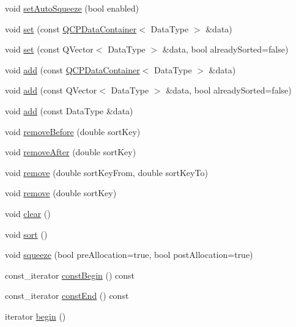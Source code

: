 \begin{DoxyCompactItemize}
\item 
void \hyperlink{classQCPDataContainer_a233f866760a78950d2a393c1a4bc54b5}{set\+Auto\+Squeeze} (bool enabled)
\item 
void \hyperlink{classQCPDataContainer_ae7042bd534fc3ce7befa2ce3f790b5bf}{set} (const \hyperlink{classQCPDataContainer}{Q\+C\+P\+Data\+Container}$<$ Data\+Type $>$ \&data)
\item 
void \hyperlink{classQCPDataContainer_aff99fffbb26597a354c4bc8312596ab2}{set} (const Q\+Vector$<$ Data\+Type $>$ \&data, bool already\+Sorted=false)
\item 
void \hyperlink{classQCPDataContainer_a42b98bd994307ccd163a43d576f91ad9}{add} (const \hyperlink{classQCPDataContainer}{Q\+C\+P\+Data\+Container}$<$ Data\+Type $>$ \&data)
\item 
void \hyperlink{classQCPDataContainer_a51d2a4c9ce4baf5e950b767d26673972}{add} (const Q\+Vector$<$ Data\+Type $>$ \&data, bool already\+Sorted=false)
\item 
void \hyperlink{classQCPDataContainer_a715e8e9972466804954a2f8fbd5288b7}{add} (const Data\+Type \&data)
\item 
void \hyperlink{classQCPDataContainer_aa7f74cbce304b0369e1626c3798e1eda}{remove\+Before} (double sort\+Key)
\item 
void \hyperlink{classQCPDataContainer_abbe5d87ffc10b5aeffa5bb42cf03aa3c}{remove\+After} (double sort\+Key)
\item 
void \hyperlink{classQCPDataContainer_ae5f569a120648b167efa78835f12fd38}{remove} (double sort\+Key\+From, double sort\+Key\+To)
\item 
void \hyperlink{classQCPDataContainer_a2dbded7f0732bacf9db48fdfbbb620bc}{remove} (double sort\+Key)
\item 
void \hyperlink{classQCPDataContainer_a7e2b29736c6fd761649bda1a54ba967f}{clear} ()
\item 
void \hyperlink{classQCPDataContainer_a75da92e33063b63d6da5014683591d45}{sort} ()
\item 
void \hyperlink{classQCPDataContainer_a82fcc511def22287fc62579d0706387c}{squeeze} (bool pre\+Allocation=true, bool post\+Allocation=true)
\item 
const\+\_\+iterator \hyperlink{classQCPDataContainer_a02360beeb3484df7c20f20c8f3ed4bb2}{const\+Begin} () const 
\item 
const\+\_\+iterator \hyperlink{classQCPDataContainer_ad007d9955a4fb2ec1f7e07532b59d169}{const\+End} () const 
\item 
iterator \hyperlink{classQCPDataContainer_a80032518413ab8f418f7c81182fd06cb}{begin} ()

\end{DoxyCompactItemize}
